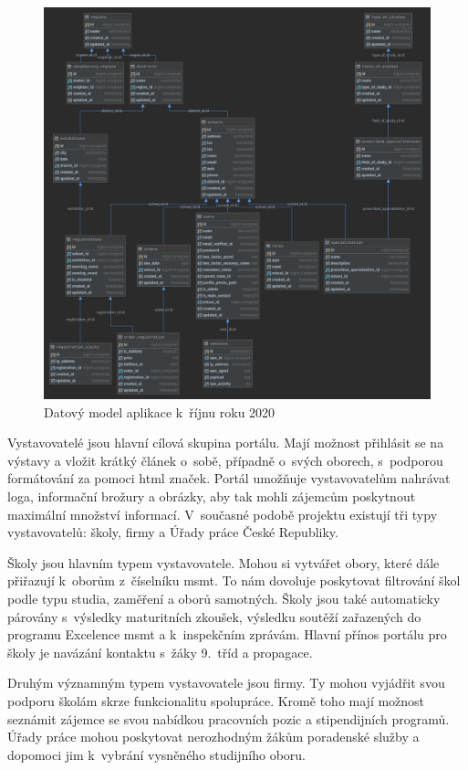 \begin{figure}[H]
\centering
\includegraphics[width=\textwidth]{img/datovy-model-rijen-2020-2.png}
\caption{Datový model aplikace \bso{} k~říjnu roku 2020}
\label{fig:data-model-2020}
\end{figure}


Vystavovatelé jsou hlavní cílová skupina portálu. Mají možnost přihlásit se na výstavy a vložit krátký článek o~sobě,
případně o~svých oborech, s~podporou formátování za pomoci \acrshort{html} značek.
Portál umožňuje vystavovatelům nahrávat loga, informační brožury a obrázky, aby tak mohli zájemcům poskytnout maximální množství informací.
V~současné podobě projektu \bso{} existují tři typy vystavovatelů: školy, firmy a Úřady práce České Republiky. 

Školy jsou hlavním typem vystavovatele.
Mohou si vytvářet obory, které dále přiřazují k~oborům z~číselníku \acrshort{msmt}.
To nám dovoluje poskytovat filtrování škol podle typu studia, zaměření a oborů samotných.
Školy jsou také automaticky párovány s~výsledky maturitních zkoušek, výsledku soutěží zařazených do programu Excelence \acrshort{msmt} a k~inspekčním zprávám.
Hlavní přínos portálu \bso{} pro školy je navázání kontaktu s~žáky 9.~tříd a propagace. 

Druhým významným typem vystavovatele jsou firmy. Ty mohou vyjádřit svou podporu školám skrze funkcionalitu spolupráce.
Kromě toho mají možnost seznámit zájemce se svou nabídkou pracovních pozic a stipendijních programů.
Úřady práce mohou poskytovat nerozhodným žákům poradenské služby a dopomoci jim k~vybrání vysněného studijního oboru.
